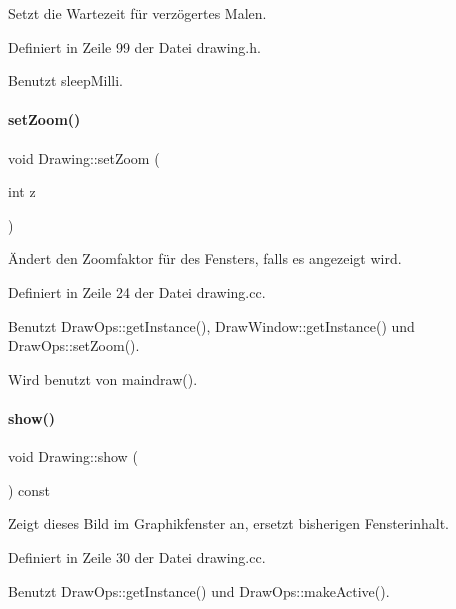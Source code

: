 Setzt die Wartezeit für verzögertes Malen. 



Definiert in Zeile 99 der Datei drawing.\+h.



Benutzt sleep\+Milli.

\mbox{\label{classDrawing_a0f16d649365d717f01b141761d487cf4}} 
\paragraph{\texorpdfstring{set\+Zoom()}{setZoom()}}
{\footnotesize\ttfamily void Drawing\+::set\+Zoom (\begin{DoxyParamCaption}\item[{int}]{z }\end{DoxyParamCaption})}



Ändert den Zoomfaktor für des Fensters, falls es angezeigt wird. 



Definiert in Zeile 24 der Datei drawing.\+cc.



Benutzt Draw\+Ops\+::get\+Instance(), Draw\+Window\+::get\+Instance() und Draw\+Ops\+::set\+Zoom().



Wird benutzt von maindraw().

\mbox{\label{classDrawing_afbc865383cc38520bd094c6ad7ac2df7}} 
\paragraph{\texorpdfstring{show()}{show()}}
{\footnotesize\ttfamily void Drawing\+::show (\begin{DoxyParamCaption}{ }\end{DoxyParamCaption}) const}



Zeigt dieses Bild im Graphikfenster an, ersetzt bisherigen Fensterinhalt. 



Definiert in Zeile 30 der Datei drawing.\+cc.



Benutzt Draw\+Ops\+::get\+Instance() und Draw\+Ops\+::make\+Active().



